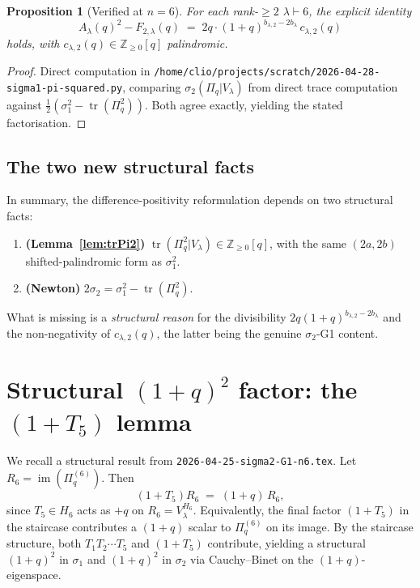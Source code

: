 \documentclass{article}
\newtheorem{proposition}[theorem]{Proposition}
\theoremstyle{definition}
\begin{document}
\begin{proposition}[Verified at $n=6$]\label{prop:explicit-diff}
For each rank-$\geq 2$ $\lambda \vdash 6$, the explicit identity
\[
  A_\lambda(q)^2 - F_{2,\lambda}(q) \;=\; 2q\cdot(1+q)^{b_{\lambda,2}-2b_\lambda}\, c_{\lambda,2}(q)
\]
holds, with $c_{\lambda,2}(q)\in\mathbb{Z}_{\geq 0}[q]$ palindromic.
\end{proposition}

\begin{proof}
Direct computation in
\verb|/home/clio/projects/scratch/2026-04-28-sigma1-pi-squared.py|, comparing
$\sigma_2(\Pi_q | V_\lambda)$ from direct trace computation against
$\frac{1}{2}(\sigma_1^2-\operatorname{tr}(\Pi_q^2))$. Both agree exactly,
yielding the stated factorisation.
\end{proof}

\subsection{The two new structural facts}

In summary, the difference-positivity reformulation depends on two structural facts:
\begin{enumerate}
\item \textbf{(Lemma~\ref{lem:trPi2})} $\operatorname{tr}(\Pi_q^2|V_\lambda) \in \mathbb{Z}_{\geq 0}[q]$, with the same $(2a,2b)$ shifted-palindromic form as $\sigma_1^2$.
\item \textbf{(Newton)} $2\sigma_2 = \sigma_1^2 - \operatorname{tr}(\Pi_q^2)$.
\end{enumerate}
What is missing is a \emph{structural reason} for the divisibility
$2q(1+q)^{b_{\lambda,2}-2b_\lambda}$ and the non-negativity of $c_{\lambda,2}(q)$,
the latter being the genuine $\sigma_2$-G1 content.

\section{Structural $(1+q)^2$ factor: the $(1+T_5)$ lemma}

We recall a structural result from \verb|2026-04-25-sigma2-G1-n6.tex|. Let
$R_6 = \operatorname{im}(\Pi_q^{(6)})$. Then
\[
  (1+T_5) R_6 \;=\; (1+q)\, R_6,
\]
since $T_5 \in H_6$ acts as $+q$ on $R_6 = V_\lambda^{H_6}$. Equivalently, the
final factor $(1+T_5)$ in the staircase contributes a $(1+q)$ scalar to
$\Pi_q^{(6)}$ on its image. By the staircase structure, both $T_1 T_2\cdots T_5$
and $(1+T_5)$ contribute, yielding a structural $(1+q)^2$ in $\sigma_1$ and
$(1+q)^2$ in $\sigma_2$ via Cauchy--Binet on the $(1+q)$-eigenspace.
\end{document}
